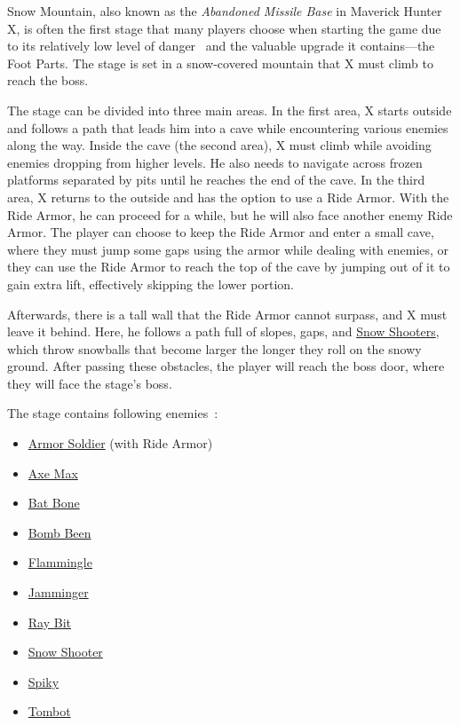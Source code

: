 Snow Mountain, also known as the \textit{Abandoned Missile Base} in Maverick Hunter X, is often the first stage that many players choose when starting the game due to its relatively low level of danger~\cite{stratwiki:Snow_mountain} and the valuable upgrade it contains—the Foot Parts. The stage is set in a snow-covered mountain that X must climb to reach the boss.

The stage can be divided into three main areas. In the first area, X starts outside and follows a path that leads him into a cave while encountering various enemies along the way. Inside the cave (the second area), X must climb while avoiding enemies dropping from higher levels. He also needs to navigate across frozen platforms separated by pits until he reaches the end of the cave. In the third area, X returns to the outside and has the option to use a Ride Armor. With the Ride Armor, he can proceed for a while, but he will also face another enemy Ride Armor. The player can choose to keep the Ride Armor and enter a small cave, where they must jump some gaps using the armor while dealing with enemies, or they can use the Ride Armor to reach the top of the cave by jumping out of it to gain extra lift, effectively skipping the lower portion.

Afterwards, there is a tall wall that the Ride Armor cannot surpass, and X must leave it behind. Here, he follows a path full of slopes, gaps, and \hyperlink{enem:Snow_Shooter}{Snow Shooters}, which throw snowballs that become larger the longer they roll on the snowy ground. After passing these obstacles, the player will reach the boss door, where they will face the stage's boss.

The stage contains following enemies~\cite{wiki:Snow_mountain}:
\begin{itemize}
	\item \hyperlink{enem:Armor_Soldier}{Armor Soldier} (with Ride Armor)
	\item \hyperlink{enem:Axe_Max}{Axe Max}
	\item \hyperlink{enem:Batton_Bone}{Bat Bone}
	\item \hyperlink{enem:Bomb_Been}{Bomb Been}
	\item \hyperlink{enem:Flammingle}{Flammingle}
	\item \hyperlink{enem:Jamminger}{Jamminger }
	\item \hyperlink{enem:Ray_Bit}{Ray Bit}
	\item \hyperlink{enem:Snow_Shooter}{Snow Shooter}
	\item \hyperlink{enem:Spiky}{Spiky}
	\item \hyperlink{enem:Tombot}{Tombot}
\end{itemize}

